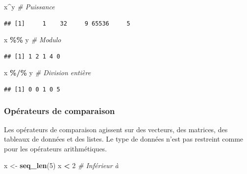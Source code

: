 \documentclass[
  11pt,
]{book}
\newenvironment{Shaded}{\begin{snugshade}}{\end{snugshade}}
\newcommand{\CommentTok}[1]{\textcolor[rgb]{0.56,0.35,0.01}{\textit{#1}}}
\newcommand{\DecValTok}[1]{\textcolor[rgb]{0.00,0.00,0.81}{#1}}
\newcommand{\KeywordTok}[1]{\textcolor[rgb]{0.13,0.29,0.53}{\textbf{#1}}}
\newcommand{\NormalTok}[1]{#1}
\newcommand{\OperatorTok}[1]{\textcolor[rgb]{0.81,0.36,0.00}{\textbf{#1}}}
\newcommand{\StringTok}[1]{\textcolor[rgb]{0.31,0.60,0.02}{#1}}
\numberwithin{equation}{section}
\numberwithin{countremarque}{section}
\begin{document}
\begin{Shaded}
\begin{Highlighting}[]
\NormalTok{x}\OperatorTok{\^{}}\NormalTok{y  }\CommentTok{\# Puissance}
\end{Highlighting}
\end{Shaded}

\begin{lstlisting}
## [1]     1    32     9 65536     5
\end{lstlisting}

\begin{Shaded}
\begin{Highlighting}[]
\NormalTok{x }\OperatorTok{\%\%}\StringTok{ }\NormalTok{y  }\CommentTok{\# Modulo}
\end{Highlighting}
\end{Shaded}

\begin{lstlisting}
## [1] 1 2 1 4 0
\end{lstlisting}

\begin{Shaded}
\begin{Highlighting}[]
\NormalTok{x }\OperatorTok{\%/\%}\StringTok{ }\NormalTok{y }\CommentTok{\# Division entière}
\end{Highlighting}
\end{Shaded}

\begin{lstlisting}
## [1] 0 0 1 0 5
\end{lstlisting}

\hypertarget{opuxe9rateurs-de-comparaison}{%
\subsubsection{Opérateurs de comparaison}\label{opuxe9rateurs-de-comparaison}}

Les opérateurs de comparaison agissent sur des vecteurs, des matrices, des tableaux de données et des listes. Le type de données n'est pas restreint comme pour les opérateurs arithmétiques.

\begin{Shaded}
\begin{Highlighting}[]
\NormalTok{x \textless{}{-}}\StringTok{ }\KeywordTok{seq\_len}\NormalTok{(}\DecValTok{5}\NormalTok{)}
\NormalTok{x }\OperatorTok{\textless{}}\StringTok{ }\DecValTok{2}  \CommentTok{\# Inférieur à}
\end{Highlighting}
\end{Shaded}
\end{document}
